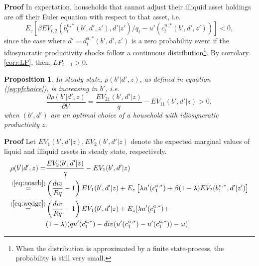 \documentclass[11pt]{article} %
\newtheorem{prop}{Proposition}
\begin{document}
\textbf{Proof} In expectation, households that cannot adjust their illiquid asset holdings are off their Euler equation with respect to that asset, i.e.
\begin{equation}
E_z \left[ \beta EV_{t,2}(b_t^{n,*}(b',d',z'),d'|z')/q_t - u'(c^{n,*}_t(b',d',z')) \right] <0,
\end{equation}
since the case where $d' = d_t^{a,*}(b',d',z')$ is a zero probability event if the idiosyncratic productivity shocks follow a continuous distribution\footnote{When the distribution is approximated by a finite state-process, the probability is still very small.}. By corrolary \ref{corr:LP}, then, $LP_{t-1}>0$.


\begin{prop}\label{prop:rho}
In steady state, $\rho(b'|d',z)$, as defined in equation (\ref{eq:pfchoice}), is increasing in $b'$, i.e.
\begin{equation}
\frac{\partial \rho(b'|d',z)}{\partial b'} = \frac{EV_{21}(b',d'|z)}{q} - EV_{11}(b',d'|z) > 0,
\end{equation}
when $(b',d')$ are an optimal choice of a household with idiosyncratic productivity $z$.
\end{prop}
\textbf{Proof} Let $EV_1(b',d'|z),EV_2(b',d'|z)$ denote the expected marginal values of liquid and illiquid assets in steady state, respectively.
\begin{align}
\rho(b'|d',z) =& \frac{EV_2(b',d'|z)}{q}-EV_1(b',d'|z) \\ \overset{ (\ref{eq:noarb})}{=}& \left( \frac{div}{Rq} - 1 \right) EV_1(b',d'|z) + E_z\left[ \lambda u'(c_1^{a,*}) + \beta (1-\lambda) EV_2(b_1^{n,*},d'|z')\right]\\
\overset{(\ref{eq:wedge})}{=} &  \left( \frac{div}{Rq} - 1 \right) EV_1(b',d'|z) + E_z [ \lambda u'(c_1^{a,*}) +\nonumber \\ & (1-\lambda) (q u'(c_1^{a,*}) - div( u'(c_1^{n,*})-u'(c_1^{a,*}))-\omega) ]\label{eq:rhostep1}
\end{align}
\end{document}
